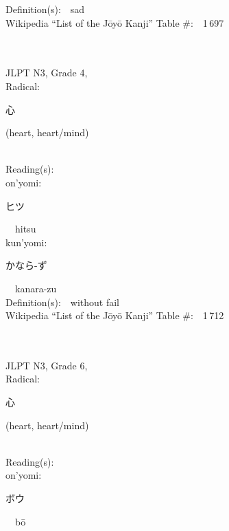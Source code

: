 \begin{multicols}{2}
Definition(s):\ \ sad \\
Wikipedia ``List of the J\=oy\=o Kanji'' Table \#:\ \ 1\,697 \\
\ \ \\
{\fontsize{34pt}{40pt}  }\ \ \\  %
{JLPT N3, Grade 4, \\Radical:\ \ {\begin{CJK}{UTF8}{min} 心 \end{CJK}} (heart, heart/mind) } \\
Reading(s):\ \ \\
{\hspace*{1em}}on'yomi:\ \ \\
{\hspace*{2em}}{\begin{CJK}{UTF8}{min} ヒツ \end{CJK}}\ \ hitsu\ \ \\
{\hspace*{1em}}kun'yomi:\ \ \\
{\hspace*{2em}}{\begin{CJK}{UTF8}{min} かなら-ず \end{CJK}}\ \ kanara-zu\ \ \\
Definition(s):\ \ without fail \\
Wikipedia ``List of the J\=oy\=o Kanji'' Table \#:\ \ 1\,712 \\
\ \ \\
{\fontsize{34pt}{40pt}  }\ \ \\  %
{JLPT N3, Grade 6, \\Radical:\ \ {\begin{CJK}{UTF8}{min} 心 \end{CJK}} (heart, heart/mind) } \\
Reading(s):\ \ \\
{\hspace*{1em}}on'yomi:\ \ \\
{\hspace*{2em}}{\begin{CJK}{UTF8}{min} ボウ \end{CJK}}\ \ b\=o\ \ \\

\end{multicols}
